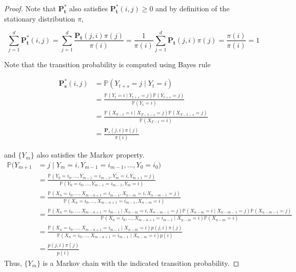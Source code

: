 \begin{proof}
		Note that $\mathbf{P_t^*}$ also satisfies $\mathbf{P_t^*} (i, j) \geq 0$ and by definition of the stationary distribution $\pi$, 

			\begin{equation}
				\sum_{j=1}^d \mathbf{P_t^*} (i, j) = \sum_{j=1}^d \frac{\mathbf{P_t}(j, i) \pi(j)}{\pi(i)} = \frac{1}{\pi(i)} \sum_{j=1}^d \mathbf{P_t}(j, i) \pi(j) = \frac{\pi(i)}{\pi(i)} = 1
			\end{equation}

		Note that the transition probability is computed using Bayes rule 

		\begin{align*}
			\mathbf{P_s^*}(i, j) & = \mathbb{P}(Y_{t + s} = j \mid Y_t = i) \\
			& = \frac{\mathbb{P}(Y_t = i \mid Y_{t + s} = j) \mathbb{P}(Y_{t + s} = j)}{\mathbb{P}(Y_t = i)} \\
			& = \frac{\mathbb{P}(X_{T - t} = i \mid X_{T - t - s} = j) \mathbb{P}(X_{T - t - s} = j)}{\mathbb{P}(X_{T - t} = i)} \\
			& = \frac{\mathbf{P}_s (j, i) \pi(j)}{\pi(i)}
		\end{align*}

		and $\{Y_m\}$ also satisfies the Markov property. 
		{\footnotesize
		\begin{align}
			\mathbb{P}(Y_{m+1} & = j \mid Y_m = i, Y_{m-1} = i_{m-1}, \ldots, Y_0 = i_0) \\
			& = \frac{\mathbb{P}(Y_0 = i_0, \ldots, Y_{m-1} = i_{m-1}, Y_{m} = i, Y_{m+1} = j)}{\mathbb{P}(Y_0 = i_0, \ldots, Y_{m-1} = i_{m-1}, Y_{m} = i)} \\
			& = \frac{\mathbb{P}(X_n = i_0, \ldots, X_{m-n+1} = i_{m-1}, X_{n-m} = i, X_{n-m-1} = j)}{\mathbb{P}(X_n = i_0, \ldots, X_{m-n+1} = i_{m-1}, X_{n-m} = i)} \\
			& = \frac{\mathbb{P}(X_n = i_0, \ldots,  X_{m-n+1} = i_{m-1} \mid X_{n-m} = i, X_{n-m-1} = j) \mathbb{P}(X_{n-m} = i \mid X_{n-m-1} = j) \mathbb{P}(X_{n-m-1} = j)}{\mathbb{P}(X_n = i_0, \ldots, X_{m-n+1} = i_{m-1} \mid X_{n-m} = i) \mathbb{P}(X_{n-m} = i)} \\
			& = \frac{\mathbb{P}(X_n = i_0, \ldots, X_{m-n+1} = i_{m-1} \mid X_{n-m} = i) p(j, i) \pi(j)}{\mathbb{P}(X_n = i_0, \ldots, X_{m-n+1} = i_{m-1} \mid X_{n-m} = i) p(i)} \\
			& = \frac{p(j, i) \pi(j)}{p(i)}
		\end{align}}
		Thus, $\{Y_m\}$ is a Markov chain with the indicated transition probability. 
	\end{proof}

